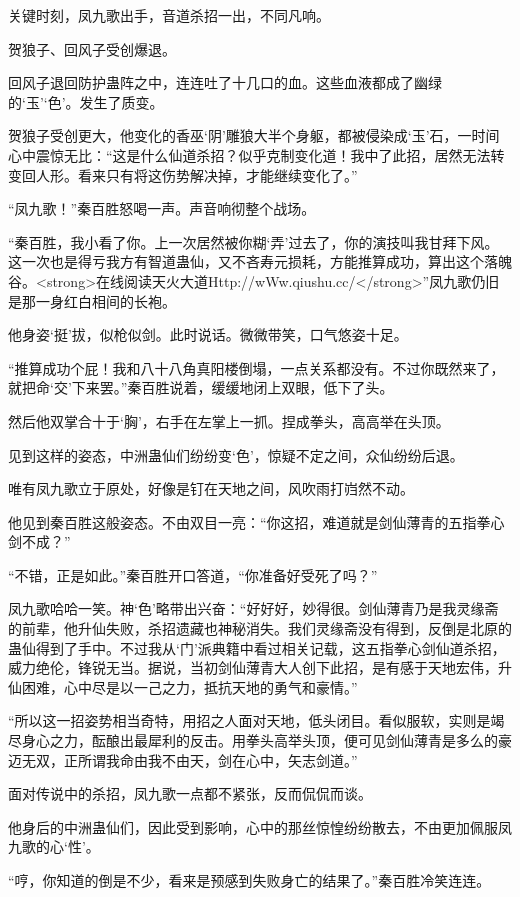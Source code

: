 \begin{this_body}
关键时刻，凤九歌出手，音道杀招一出，不同凡响。

贺狼子、回风子受创爆退。

回风子退回防护蛊阵之中，连连吐了十几口的血。这些血液都成了幽绿的‘玉’‘色’。发生了质变。

贺狼子受创更大，他变化的香巫‘阴’雕狼大半个身躯，都被侵染成‘玉’石，一时间心中震惊无比：“这是什么仙道杀招？似乎克制变化道！我中了此招，居然无法转变回人形。看来只有将这伤势解决掉，才能继续变化了。”

“凤九歌！”秦百胜怒喝一声。声音响彻整个战场。

“秦百胜，我小看了你。上一次居然被你糊‘弄’过去了，你的演技叫我甘拜下风。这一次也是得亏我方有智道蛊仙，又不吝寿元损耗，方能推算成功，算出这个落魄谷。<strong>在线阅读天火大道Http://wWw.qiushu.cc/</strong>”凤九歌仍旧是那一身红白相间的长袍。

他身姿‘挺’拔，似枪似剑。此时说话。微微带笑，口气悠姿十足。

“推算成功个屁！我和八十八角真阳楼倒塌，一点关系都没有。不过你既然来了，就把命‘交’下来罢。”秦百胜说着，缓缓地闭上双眼，低下了头。

然后他双掌合十于‘胸’，右手在左掌上一抓。捏成拳头，高高举在头顶。

见到这样的姿态，中洲蛊仙们纷纷变‘色’，惊疑不定之间，众仙纷纷后退。

唯有凤九歌立于原处，好像是钉在天地之间，风吹雨打岿然不动。

他见到秦百胜这般姿态。不由双目一亮：“你这招，难道就是剑仙薄青的五指拳心剑不成？”

“不错，正是如此。”秦百胜开口答道，“你准备好受死了吗？”

凤九歌哈哈一笑。神‘色’略带出兴奋：“好好好，妙得很。剑仙薄青乃是我灵缘斋的前辈，他升仙失败，杀招遗藏也神秘消失。我们灵缘斋没有得到，反倒是北原的蛊仙得到了手中。不过我从‘门’派典籍中看过相关记载，这五指拳心剑仙道杀招，威力绝伦，锋锐无当。据说，当初剑仙薄青大人创下此招，是有感于天地宏伟，升仙困难，心中尽是以一己之力，抵抗天地的勇气和豪情。”

“所以这一招姿势相当奇特，用招之人面对天地，低头闭目。看似服软，实则是竭尽身心之力，酝酿出最犀利的反击。用拳头高举头顶，便可见剑仙薄青是多么的豪迈无双，正所谓我命由我不由天，剑在心中，矢志剑道。”

面对传说中的杀招，凤九歌一点都不紧张，反而侃侃而谈。

他身后的中洲蛊仙们，因此受到影响，心中的那丝惊惶纷纷散去，不由更加佩服凤九歌的心‘性’。

“哼，你知道的倒是不少，看来是预感到失败身亡的结果了。”秦百胜冷笑连连。


\end{this_body}
